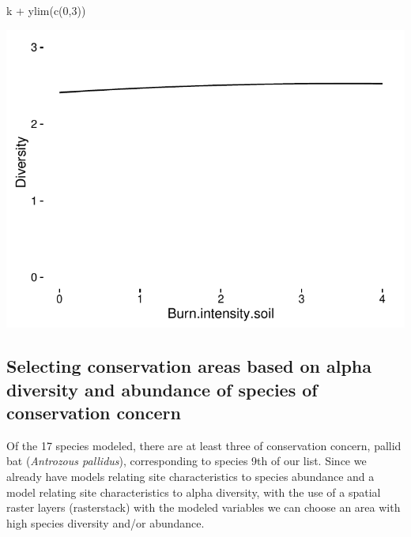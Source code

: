 \documentclass[article]{jss}
\begin{document}
\begin{CodeChunk}
\begin{CodeInput}
k + ylim(c(0,3))
\end{CodeInput}


\begin{center}\includegraphics{diversityocc_files/figure-latex/unnamed-chunk-20-3} \end{center}

\end{CodeChunk}

\subsection{Selecting conservation areas based on alpha diversity and
abundance of species of conservation
concern}\label{selecting-conservation-areas-based-on-alpha-diversity-and-abundance-of-species-of-conservation-concern}

Of the 17 species modeled, there are at least three of conservation
concern, pallid bat (\emph{Antrozous pallidus}), corresponding to
species 9th of our list. Since we already have models relating site
characteristics to species abundance and a model relating site
characteristics to alpha diversity, with the use of a spatial raster
layers (rasterstack) with the modeled variables we can choose an area
with high species diversity and/or abundance.
\end{document}
